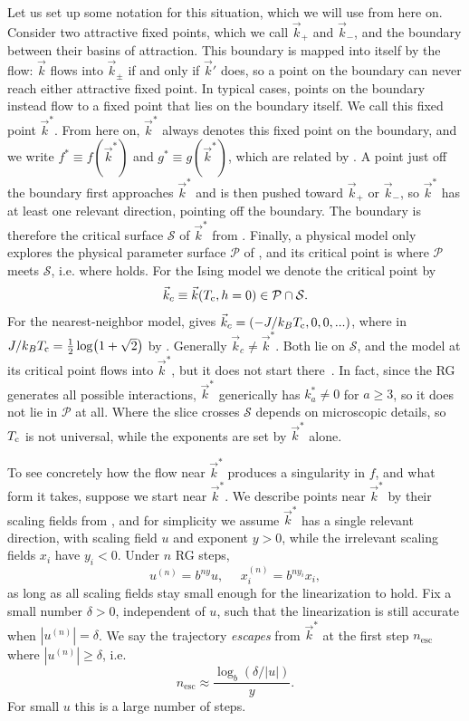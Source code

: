 Let us set up some notation for this situation, which we will use from here on.
Consider two attractive fixed points, which we call $\vec{k}_+$ and $\vec{k}_-$,
and the boundary between their basins of attraction. This boundary is mapped
into itself by the flow: $\vec{k}$ flows into $\vec{k}_\pm$ if and only if
$\vec{k}'$ does, so a point on the boundary can never reach either attractive
fixed point. In typical cases, points on the boundary instead flow to a fixed
point that lies on the boundary itself. We call this fixed point $\vec{k}^*$.
From here on, $\vec{k}^*$ always denotes this fixed point on the boundary, and we
write $f^*\equiv f(\vec{k}^*)$ and $g^*\equiv g(\vec{k}^*)$, which are related
by . A point just off the boundary first approaches
$\vec{k}^*$ and is then pushed toward $\vec{k}_+$ or $\vec{k}_-$, so $\vec{k}^*$
has at least one relevant direction, pointing off the boundary. The boundary is
therefore the critical surface $\mathcal{S}$ of $\vec{k}^*$ from
. Finally, a physical model only explores the physical parameter surface
$\mathcal{P}$ of , and its critical point is where
$\mathcal{P}$ meets $\mathcal{S}$, i.e. where 
holds. For the Ising model we denote the critical point by
\begin{equation}
  \vec{k}_c\equiv\vec{k}(T_{\rm c},h=0)\in\mathcal{P}\cap\mathcal{S}.
\end{equation}
For the nearest-neighbor model,  gives
$\vec{k}_c=(-J/k_BT_{\rm c},0,0,...)$, where in 
$J/k_BT_{\rm c}=\frac{1}{2}\log(1+\sqrt{2})$ by .
Generally $\vec{k}_c\neq\vec{k}^*$. Both lie on $\mathcal{S}$, and the model at
its critical point flows into $\vec{k}^*$, but it does not start
there~\cite{cardy_scaling_1996,kardar_fields_2007}. In fact, since the RG
generates all possible interactions, $\vec{k}^*$ generically has $k^*_a\neq0$
for $a\geq3$, so it does not lie in $\mathcal{P}$ at all. Where the slice crosses
$\mathcal{S}$ depends on microscopic details, so $T_{\rm c}$ is not universal, while
the exponents are set by $\vec{k}^*$ alone.

To see concretely how the flow near $\vec{k}^*$ produces a singularity in $f$,
and what form it takes, suppose we start near $\vec{k}^*$. We describe points
near $\vec{k}^*$ by their scaling fields from , and
for simplicity we assume $\vec{k}^*$ has a single relevant direction, with
scaling field $u$ and exponent $y>0$, while the irrelevant scaling fields $x_i$
have $y_i<0$. Under $n$ RG steps,
\begin{equation}
  u^{(n)}=b^{ny}u,~~~~~~x_i^{(n)}=b^{ny_i}x_i,
\end{equation}
as long as all scaling fields stay small enough for the linearization to hold.
Fix a small number $\delta>0$, independent of $u$, such that the linearization
is still accurate when $|u^{(n)}|=\delta$. We say the trajectory {\it escapes}
from $\vec{k}^*$ at the first step $n_\text{esc}$ where $|u^{(n)}|\geq\delta$,
i.e.
\begin{equation}
  n_\text{esc}\approx\frac{\log_b(\delta/|u|)}{y}.
\end{equation}
For small $u$ this is a large number of steps.


